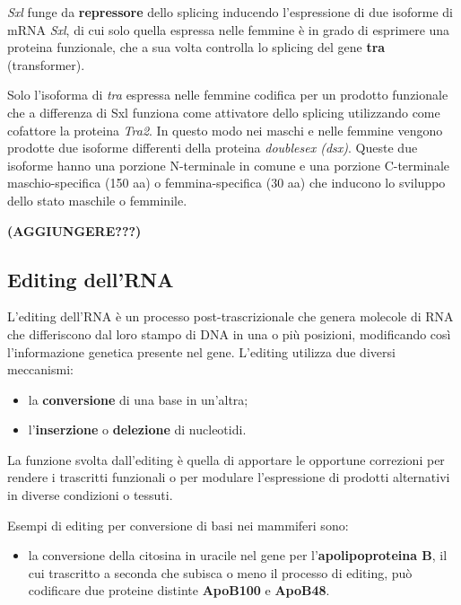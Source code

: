 \documentclass[11pt]{book}
\begin{document}
\emph{Sxl} funge da \textbf{repressore} dello splicing inducendo
l'espressione di due isoforme di mRNA \emph{Sxl}, di cui solo quella
espressa nelle femmine è in grado di esprimere una proteina funzionale,
che a sua volta controlla lo splicing del gene \textbf{tra}
(transformer).

Solo l'isoforma di \emph{tra} espressa nelle femmine codifica per un
prodotto funzionale che a differenza di Sxl funziona come attivatore
dello splicing utilizzando come cofattore la proteina \emph{Tra2}. In
questo modo nei maschi e nelle femmine vengono prodotte due isoforme
differenti della proteina \emph{doublesex (dsx)}. Queste due isoforme
hanno una porzione N-terminale in comune e una porzione C-terminale
maschio-specifica (150 aa) o femmina-specifica (30 aa) che inducono lo
sviluppo dello stato maschile o femminile.

\textbf{(AGGIUNGERE???)}

\subsection{Editing dell'RNA}\label{editing-dellrna}

L'editing dell'RNA è un processo post-trascrizionale che genera molecole
di RNA che differiscono dal loro stampo di DNA in una o più posizioni,
modificando così l'informazione genetica presente nel gene. L'editing
utilizza due diversi meccanismi:

\begin{itemize}
\itemsep1pt\parskip0pt
\item
  la \textbf{conversione} di una base in un'altra;
\item
  l'\textbf{inserzione} o \textbf{delezione} di nucleotidi.
\end{itemize}

La funzione svolta dall'editing è quella di apportare le opportune
correzioni per rendere i trascritti funzionali o per modulare
l'espressione di prodotti alternativi in diverse condizioni o tessuti.

Esempi di editing per conversione di basi nei mammiferi sono:

\begin{itemize}
\itemsep1pt\parskip0pt
\item
  la conversione della citosina in uracile nel gene per
  l'\textbf{apolipoproteina B}, il cui trascritto a seconda che subisca
  o meno il processo di editing, può codificare due proteine distinte
  \textbf{ApoB100} e \textbf{ApoB48}.
\end{itemize}
\end{document}
